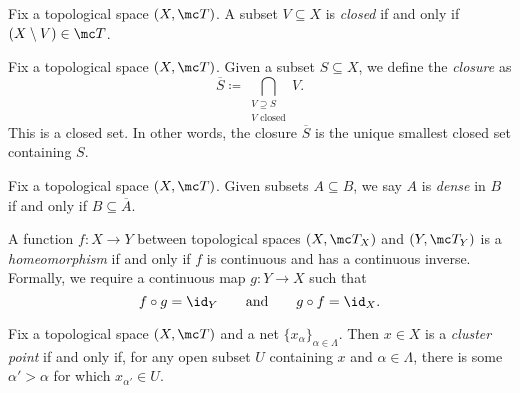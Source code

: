 \documentclass{article}
\begin{document}
\begin{definition}[Closed]
	Fix a topological space $(X,\mc T)$. A subset $V\subseteq X$ is \textit{closed} if and only if $(X\setminus V)\in\mc T$.
\end{definition}
\begin{definition}[Closure]
	Fix a topological space $(X,\mc T)$. Given a subset $S\subseteq X$, we define the \textit{closure} as
	\[\overline S\coloneqq\bigcap_{\substack{V\supseteq S\\V\text{ closed}}}V.\]
	This is a closed set. In other words, the closure $\overline S$ is the unique smallest closed set containing $S$.
\end{definition}
\begin{defi}[Dense]
	Fix a topological space $(X,\mc T)$. Given subsets $A\subseteq B$, we say $A$ is \textit{dense} in $B$ if and only if $B\subseteq\overline A$.
\end{defi}
\begin{definition}[Homeomorphism]
	A function $f\colon X\to Y$ between topological spaces $(X,\mc T_X)$ and $(Y,\mc T_Y)$ is a \textit{homeomorphism} if and only if $f$ is continuous and has a continuous inverse. Formally, we require a continuous map $g\colon Y\to X$ such that
	\[f\circ g={\id_Y}\qquad\text{and}\qquad g\circ f={\id_X}.\]
\end{definition}
\begin{definition}
	Fix a topological space $(X,\mc T)$ and a net $\{x_\alpha\}_{\alpha\in\Lambda}$. Then $x\in X$ is a \textit{cluster point} if and only if, for any open subset $U$ containing $x$ and $\alpha\in\Lambda$, there is some $\alpha'>\alpha$ for which $x_{\alpha'}\in U$.
\end{definition}
\end{document}
